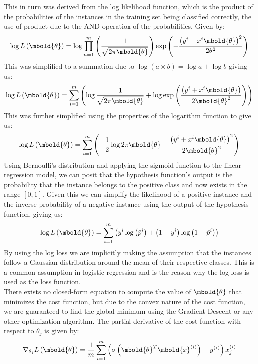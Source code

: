\documentclass[12pt letter]{report}
\begin{document}
This in turn was derived from the log likelihood function, which is the product of the probabilities of the instances in the
training set being classified correctly, the use of product due to the AND operation of the probabilities. Given by:
\[
  \log L \left( \mbold{\theta} \right) = \log \prod_{n=1}^{m}  \left( \frac{1}{\sqrt{2 \pi \mbold{\theta}}} \right)  \exp \left( - \frac{ \left( y^{i} -
    x^{i}\mbold{\theta} \right)^2 }{2 \theta^2} \right)
\]
This was simplified to a summation due to $\log \left( a\times b \right) = \log a + \log b $ giving us:
\[
  \log L \left( \mbold{\theta} \right) = \displaystyle\sum_{i=1}^{m} \left( \log \frac{1}{\sqrt{2 \pi \mbold{\theta}}} +
  \log \exp \left( \frac{ \left( y^{i} + x^{i} \mbold{\theta} \right) }{2 \mbold{\theta}^2} \right)  \right)
\]
This was further simplified using the properties of the logarithm function to give us:
\[
  \log L \left( \mbold{\theta} \right) = \displaystyle\sum_{i=1}^{m} \left( - \frac{1}{2} \log 2 \pi \mbold{\theta} - \frac{ \left( y^{i} + x^{i} \mbold{\theta} \right)^2 }{2 \mbold{\theta}^2}  \right)
\]
Using Bernoulli's distribution and applying the sigmoid function to the linear regression model, we can posit that the
hypothesis function's output is the probability that the instance belongs to the positive class and now exists in the
range $[0, 1]$. Given this we can simplify the likelihood of a positive instance and the inverse probability of a
negative instance using the output of the hypothesis function, giving us:
\[
  \log L \left( \mbold{\theta} \right) = \displaystyle\sum_{i=1}^{m} \left( y^{i} \log \left( \hat{p}^{i} \right) + \left( 1 - y^{i} \right) \log \left( 1 - \hat{p}^{i} \right)  \right)
\]
By using the log loss we are implicitly making the assumption that the instances follow a Gaussian distribution around
the mean of their respective classes. This is a common assumption in logistic regression and is the reason why the
log loss is used as the loss function. \\

There exists no closed-form equation to compute the value of $\mbold{\theta}$ that minimizes the cost function, but due
to the convex nature of the cost function, we are guaranteed to find the global minimum using the Gradient Descent or
any other optimization algorithm. The partial derivative of the cost function with respect to $\theta_j$ is given by:
\[
  \nabla_{\theta_j} L \left( \mbold{\theta} \right) = \frac{1}{m} \displaystyle\sum_{i=1}^{m} \left( \sigma \left( \mbold{\theta}^{T} \mbold{x}^{(i)} \right) - y^{(i)} \right) x_j^{(i)}
\]
\end{document}
